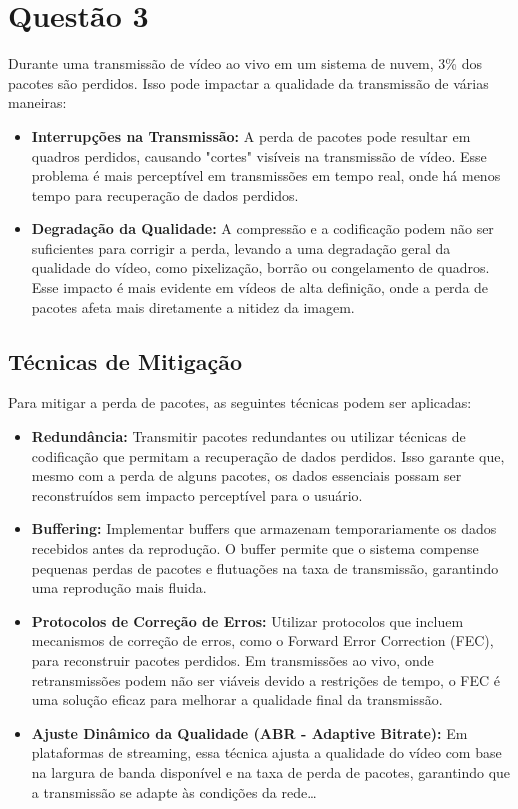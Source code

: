 \documentclass[a4paper,12pt]{article}
\begin{document}
\section*{Questão 3}
Durante uma transmissão de vídeo ao vivo em um sistema de nuvem, 3\% dos pacotes são perdidos. Isso pode impactar a qualidade da transmissão de várias maneiras:

\begin{itemize}
    \item \textbf{Interrupções na Transmissão:} A perda de pacotes pode resultar em quadros perdidos, causando "cortes" visíveis na transmissão de vídeo. Esse problema é mais perceptível em transmissões em tempo real, onde há menos tempo para recuperação de dados perdidos.
    
    \item \textbf{Degradação da Qualidade:} A compressão e a codificação podem não ser suficientes para corrigir a perda, levando a uma degradação geral da qualidade do vídeo, como pixelização, borrão ou congelamento de quadros. Esse impacto é mais evidente em vídeos de alta definição, onde a perda de pacotes afeta mais diretamente a nitidez da imagem.
\end{itemize}

\subsection*{Técnicas de Mitigação}
Para mitigar a perda de pacotes, as seguintes técnicas podem ser aplicadas:

\begin{itemize}
    \item \textbf{Redundância:} Transmitir pacotes redundantes ou utilizar técnicas de codificação que permitam a recuperação de dados perdidos. Isso garante que, mesmo com a perda de alguns pacotes, os dados essenciais possam ser reconstruídos sem impacto perceptível para o usuário.
    
    \item \textbf{Buffering:} Implementar buffers que armazenam temporariamente os dados recebidos antes da reprodução. O buffer permite que o sistema compense pequenas perdas de pacotes e flutuações na taxa de transmissão, garantindo uma reprodução mais fluida.

    \item \textbf{Protocolos de Correção de Erros:} Utilizar protocolos que incluem mecanismos de correção de erros, como o Forward Error Correction (FEC), para reconstruir pacotes perdidos. Em transmissões ao vivo, onde retransmissões podem não ser viáveis devido a restrições de tempo, o FEC é uma solução eficaz para melhorar a qualidade final da transmissão.

    \item \textbf{Ajuste Dinâmico da Qualidade (ABR - Adaptive Bitrate):} Em plataformas de streaming, essa técnica ajusta a qualidade do vídeo com base na largura de banda disponível e na taxa de perda de pacotes, garantindo que a transmissão se adapte às condições da rede\dots

  \end{itemize}
\end{document}
